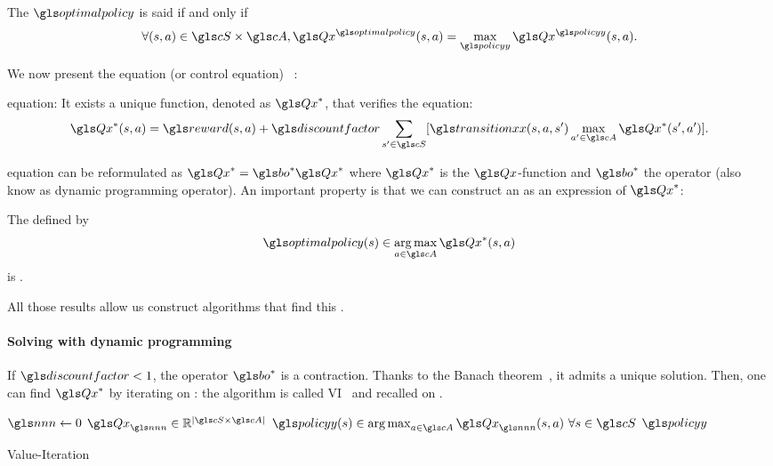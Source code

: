 \begin{definition}
    The  $\optimalpolicy$ is said  if and only if
    \begin{align}
        \forall (s,a) \in \cS\times\cA,\Q^{\optimalpolicy} (s,a) = \max_{\policy}\Q^{\policy} (s,a).
    \end{align}
\end{definition}

We now present the  equation (or control equation) ~\parencite{Bellman}:
\begin{theorem}{ equation}:
    It exists a unique function, denoted as $\Q^*$, that verifies the  equation:
    \begin{align}
        \Q^*(s,a)=\reward(s,a) +\discountfactor \sum_{s'\in \cS}[\transition(s,a,s')\max_{a'\in \cA}\Q^*(s',a')].
        \label{eq:bellman-control}
    \end{align}
\end{theorem}

 equation can be reformulated as $\Q^*=\bo^{*} \Q^*$ where $\Q^*$ is the  $\Q$-function and $\bo^{*}$ the  operator (also know as dynamic programming operator). An important property is that we can construct an   as an expression of $\Q^*$:
\begin{proposition}
    The  defined by
    \begin{align}
        \optimalpolicy(s) \in \argmax\limits_{a\in \cA} \Q^*(s,a)
    \end{align} is .
\end{proposition}
All those results allow us construct algorithms that find this  .

\paragraph{Solving with dynamic programming}

If $\discountfactor < 1$, the operator $\bo^{*}$ is a contraction. Thanks to the Banach theorem~\parencite{Banach1922}, it admits a unique solution. Then, one can find $\Q^*$ by iterating on : the algorithm is called \gls{VI}~\parencite{bellman57} and recalled on .

\begin{algorithm}
    \DontPrintSemicolon
    $\n\leftarrow 0$\;
    $\Q_{\n}\in \mathbb{R}^{|\cS\times\cA|}$\;
    $\policy(s) \in \argmax_{a\in\cA} \Q_{\n}(s,a)\ \forall s\in\cS$\;
    \Return $\policy$\;
    \caption{Value-Iteration}
    \label{alg:value-iteration}
\end{algorithm}



